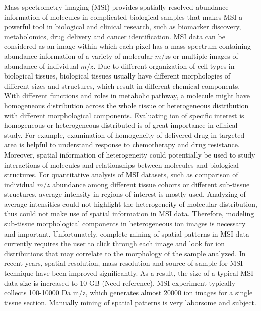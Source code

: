 \documentclass{bioinfo}
\begin{document}
Mass spectrometry imaging (MSI) provides spatially resolved abundance information of molecules in complicated biological samples that makes MSI a powerful tool in biological and clinical research, such as biomarker discovery, metabolomics, drug delivery and cancer identification. MSI data can be considered as  an image within which each pixel has a mass spectrum containing  abundance information of a variety of molecular $m/z$s or multiple images of abundance of individual $m/z$.  Due to different organization of cell types in biological tissues,  biological tissues usually have different morphologies of different sizes and structures, which result in different chemical components.  With different functions and roles in metabolic pathway, a molecule might have homogeneous distribution across the whole tissue or heterogeneous distribution with different morphological components.  Evaluating ion of specific interest is homogeneous or heterogeneous distributed is of great importance in clinical study. For example, examination of homogeneity of delivered drug in targeted area is helpful to understand response to chemotherapy and drug resistance. Moreover, spatial information of heterogeneity could potentially be used to study interactions of molecules and relationships between molecules and biological structures.  For quantitative analysis of MSI datasets, such as comparison of individual $m/z$ abundance among different tissue cohorts or different sub-tissue structures, average intensity in regions of interest is mostly used. Analyzing of average intensities could not highlight the heterogeneity of molecular distribution, thus could not make use of spatial information in MSI data. Therefore, modeling sub-tissue morphological components in heterogeneous ion images is necessary and important.
Unfortunately, complete mining of spatial patterns in MSI data currently requires the user to click through each image and look for ion distributions that may correlate to the morphology of the sample analyzed. In recent years, spatial resolution, mass resolution and source of sample for MSI technique have been improved significantly. As a result, the size of a typical MSI data size is increased to 10 GB (Need reference). 
MSI experiment typically collects 100-10000 Da m/z, which generates almost 20000 ion images for a single tissue section. Manually mining of spatial patterns  is very laborsome and subject. \\
\end{document}
